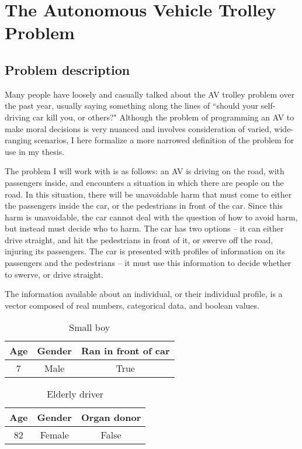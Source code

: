 \section{The Autonomous Vehicle Trolley Problem}
\subsection{Problem description}
Many people have loosely and casually talked about the AV trolley problem over the past year, usually saying something along the lines of ``should your self-driving car kill you, or others?" Although the problem of programming an AV to make moral decisions is very nuanced and involves consideration of varied, wide-ranging scenarios, I here formalize a more narrowed definition of the problem for use in my thesis.

The problem I will work with is as follows: an AV is driving on the road, with passengers inside, and encounters a situation in which there are people on the road. In this situation, there will be unavoidable harm that must come to either the passengers inside the car, or the pedestrians in front of the car. Since this harm is unavoidable, the car cannot deal with the question of how to avoid harm, but instead must decide who to harm. The car has two options -- it can either drive straight, and hit the pedestrians in front of it, or swerve off the road, injuring its passengers. The car is presented with profiles of information on its passengers and the pedestrians -- it must use this information to decide whether to swerve, or drive straight.

\begin{definition}
The information available about an individual, or their individual profile, is a vector composed of real numbers, categorical data, and boolean values.
\end{definition}

\begin{table}
\caption{Small boy}
\begin{center}
\begin{tabular}{c | c | c}
Age & Gender & Ran in front of car \\ \hline
7 & Male & True\\
\end{tabular}
\end{center}
\end{table}

\begin{table}
\caption{Elderly driver}
\begin{center}
\begin{tabular}{c | c | c}
Age & Gender & Organ donor \\ \hline
82 & Female & False\\
\end{tabular}
\end{center}
\end{table}

